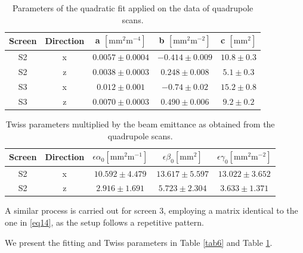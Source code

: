 \documentclass[12pt]{article}
\begin{document}
\begin{table}[H]
    \centering
    \begin{tabular}{c|c|c|c|c}
    \hline
    \hline
        Screen & Direction & a $\mathrm{[mm^2m^{-4}]}$ &b $\mathrm{[mm^2m^{-2}]}$ & c $\mathrm{[mm^2]}$ \\
    \hline
        S2& x & $0.0057 \pm 0.0004$ & $-0.414 \pm 0.009$ & $10.8 \pm 0.3$ \\ 
        S2& z & $0.0038 \pm 0.0003$ & $0.248 \pm 0.008$ & $5.1 \pm 0.3$ \\ 
        S3& x & $0.012 \pm 0.001$ & $-0.74 \pm 0.02$ & $15.2 \pm 0.8$ \\ 
        S3& z & $0.0070 \pm 0.0003$ & $0.490 \pm 0.006$ & $9.2 \pm 0.2$ \\
    \hline
    \end{tabular}
    \caption{Parameters of the quadratic fit applied on the data of quadrupole scans.}
    \label{quadratic_fit_table}
\end{table} 




\begin{table}[H]
    \centering
    \begin{tabular}{c|c|c|c|c}
        \hline
        \hline
            Screen & Direction & $\epsilon \alpha_0$$\mathrm{[mm^2m^{-1}]}$ & $\epsilon \beta_0$$\mathrm{[mm^2]}$ &$\epsilon \gamma_0$$\mathrm{[mm^2m^{-2}]}$ \\ 
        \hline
            S2 & x & $10.592 \pm 4.479$ & $13.617 \pm 5.597$ & $13.022 \pm 3.652$ \\ 
            S2 & z & $2.916 \pm 1.691$ & $5.723 \pm 2.304$ & $3.633 \pm 1.371$ \\ 

        \hline
    \end{tabular}
    \caption{Twiss parameters multiplied by the beam emittance as obtained from the quadrupole scans.}
    \label{Twiss parameters}
\end{table}

A similar process is carried out for screen 3, employing a matrix identical to the one in \ref{eq14}, as the setup follows a repetitive pattern.


We present the fitting and Twiss parameters in Table \ref{tab6} and Table \ref{quadratic_fit_table}.
\end{document}
